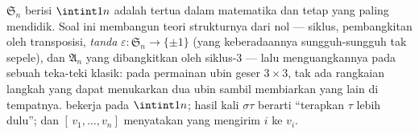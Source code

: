 \begin{problem}\label{pb:b1:structures:1}
 $\mathfrak S_n$ berisi  $\intint1n$ adalah
 tertua dalam matematika dan tetap yang paling mendidik. Soal
ini membangun teori strukturnya dari nol --- siklus,
pembangkitan oleh transposisi,  \emph{tanda}
$\varepsilon \colon \mathfrak S_n \to \{\pm1\}$ (yang keberadaannya
sungguh-sungguh tak sepele), dan  $\mathfrak A_n$
yang dibangkitkan oleh siklus-$3$ --- lalu menguangkannya pada sebuah
teka-teki klasik: pada permainan ubin geser $3 \times 3$, tak ada rangkaian langkah
yang dapat menukarkan dua ubin sambil membiarkan yang lain di tempatnya.
 bekerja pada $\intint1n$; hasil kali $\sigma\tau$ berarti
``terapkan $\tau$ lebih dulu''; dan $[\,v_1, \dots, v_n]$ menyatakan
 yang mengirim $i$ ke $v_i$.


\end{problem}
